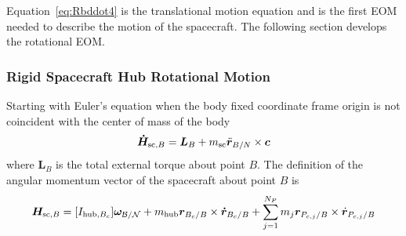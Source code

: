 Equation~\eqref{eq:Rbddot4} is the translational motion equation and is the first EOM needed to describe the motion of the spacecraft. The following section develops the rotational EOM.

\subsubsection{Rigid Spacecraft Hub Rotational Motion}

Starting with Euler's equation when the body fixed coordinate frame origin is not coincident with the center of mass of the body
\begin{equation}
	\bm{\dot{H}}_{\text{sc},B} = \bm{L}_B+m_{\text{\text{sc}}}\ddot{\bm r}_{B/N}\times\bm{c}
	\label{eq:Euler}
\end{equation}
where $\bm{L}_B$ is the total external torque about point $B$. The definition of the angular momentum vector of the spacecraft about point $B$ is
\begin{equation}
	\bm{H}_{\text{sc},B} = [I_{\text{hub},B_c}] \bm\omega_{\cal B/N} + m_{\text{hub}} \bm{r}_{B_c/B}\times\bm{\dot{r}}_{B_c/B} + \sum\limits_{j=1}^{N_P}m_j \bm r_{P_{c,j}/B}\times \dot{\bm r}_{P_{c,j}/B}
	\label{eq:Hb2}
\end{equation}

